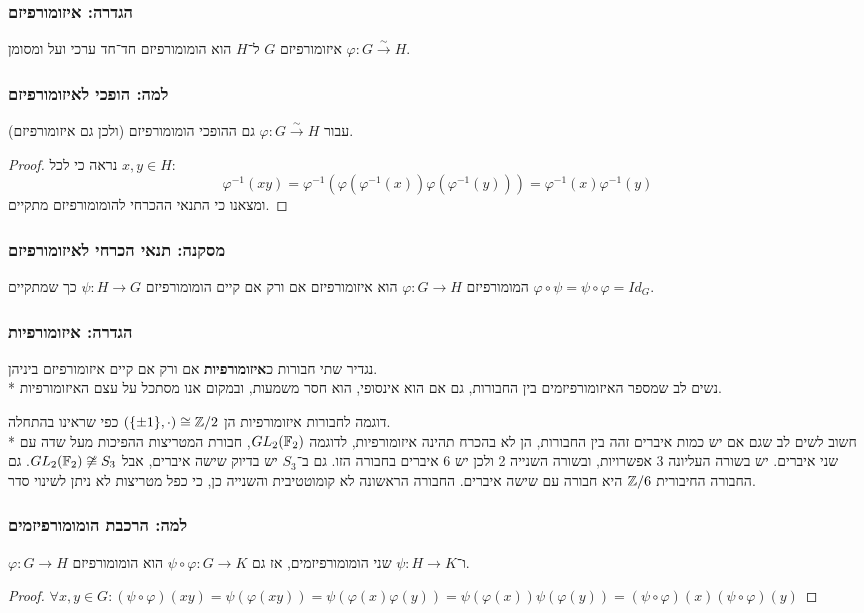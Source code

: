 \subsubsection{הגדרה: איזומורפיזם}
איזומורפיזם $G$ ל־$H$ הוא הומומורפיזם חד־חד ערכי ועל ומסומן $\varphi : G \xrightarrow{\sim} H$.

\subsubsection{למה: הופכי לאיזומורפיזם}
עבור $\varphi : G \xrightarrow{\sim} H$ גם ההופכי הומומורפיזם (ולכן גם איזומורפיזם).
\begin{proof}
	נראה כי לכל $x, y \in H$:
	\[
		\varphi^{-1}(xy)
		= \varphi^{-1}(\varphi(\varphi^{-1}(x)) \varphi(\varphi^{-1}(y)))
		= \varphi^{-1}(x) \varphi^{-1}(y)
	\]
	ומצאנו כי התנאי ההכרחי להומומורפיזם מתקיים.
\end{proof}

\subsubsection{מסקנה: תנאי הכרחי לאיזומורפיזם}
המומורפיזם $\varphi : G \to H$ הוא איזומורפיזם אם ורק אם קיים הומומורפיזם $\psi : H \to G$ כך שמתקיים $\varphi \circ \psi = \psi \circ \varphi = Id_G$.

\subsubsection{הגדרה: איזומורפיות}
נגדיר שתי חבורות כ\textbf{איזומורפיות} אם ורק אם קיים איזומורפיזם ביניהן. \\*
נשים לב שמספר האיזומורפיזמים בין החבורות, גם אם הוא אינסופי, הוא חסר משמעות, ובמקום אנו מסתכל על עצם האיזומורפיות.

דוגמה לחבורות איזומורפיות הן $(\{\pm 1\}, \cdot) \cong \mathbb{Z}/2$ כפי שראינו בהתחלה. \\*
חשוב לשים לב שגם אם יש כמות איברים זהה בין החבורות, הן לא בהכרח תהינה איזומורפיות, לדוגמה
$GL_2(\mathbb{F}_2)$, חבורת המטריצות ההפיכות מעל שדה עם שני איברים. יש בשורה העליונה 3 אפשרויות, ובשורה השנייה 2 ולכן יש 6 איברים בחבורה הזו.
גם ב־$S_3$ יש בדיוק שישה איברים, אבל $GL_2(\mathbb{F}_2) \not\cong S_3$. גם החבורה החיבורית $\mathbb{Z}/6$ היא חבורה עם שישה איברים. החבורה הראשונה לא קומוטטיבית והשנייה כן, כי כפל מטריצות לא ניתן לשינוי סדר.

\subsubsection{למה: הרכבת הומומורפיזמים}
$\varphi : G \to H$ ו־$\psi : H \to K$ שני הומומורפיזמים, אז גם $\psi \circ \varphi : G \to K$ הוא הומומורפיזם.
\begin{proof}
	$\forall x, y \in G : (\psi \circ \varphi) (xy) = \psi(\varphi(xy)) = \psi(\varphi(x) \varphi(y)) = \psi(\varphi(x)) \psi(\varphi(y)) = (\psi \circ \varphi)(x) (\psi \circ \varphi)(y)$
\end{proof}

